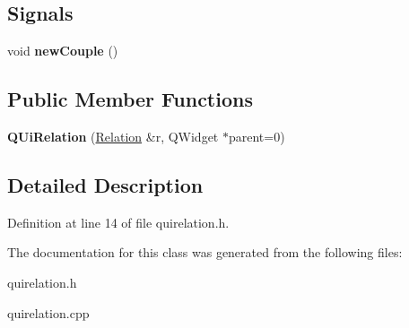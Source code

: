 \subsection*{Signals}
\begin{DoxyCompactItemize}
\item 
\mbox{\label{class_q_ui_relation_a631d95a38337e49c7d83a201d6fbe5a7}} 
void {\bfseries new\+Couple} ()
\end{DoxyCompactItemize}
\subsection*{Public Member Functions}
\begin{DoxyCompactItemize}
\item 
\mbox{\label{class_q_ui_relation_a4d31962371f2008d814958cdf3810e14}} 
{\bfseries Q\+Ui\+Relation} (\hyperlink{class_relation}{Relation} \&r, Q\+Widget $\ast$parent=0)
\end{DoxyCompactItemize}


\subsection{Detailed Description}


Definition at line 14 of file quirelation.\+h.



The documentation for this class was generated from the following files\+:\begin{DoxyCompactItemize}
\item 
quirelation.\+h\item 
quirelation.\+cpp\end{DoxyCompactItemize}
